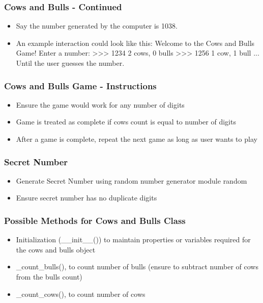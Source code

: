 \documentclass[14pt]{beamer}
\begin{document}
    \begin{frame}[containsverbatim]
        \frametitle{Cows and Bulls - Continued}
        \begin{itemize}
		\item Say the number generated by the computer is 1038. 
		\item An example interaction could look like this:
  Welcome to the Cows and Bulls Game! 
  Enter a number: 
  >>> 1234
  2 cows, 0 bulls
  >>> 1256
  1 cow, 1 bull
  ...
Until the user guesses the number.
        \end{itemize}
    \end{frame}

    \begin{frame}[containsverbatim]
        \frametitle{Cows and Bulls Game -  Instructions}
        \begin{itemize}
		\item Ensure the game would work for any number of digits
		\item Game is treated as complete if cows count is equal to number of digits
		\item After a game is complete, repeat the next game as long as user wants to play
        \end{itemize}
    \end{frame}

    \begin{frame}[containsverbatim]
        \frametitle{Secret Number}
        \begin{itemize}
		\item Generate Secret Number using random number generator module random
		\item Ensure secret number has no duplicate digits
        \end{itemize}
    \end{frame}

    \begin{frame}[containsverbatim]
        \frametitle{Possible Methods for Cows and Bulls Class}
        \begin{itemize}
        \item Initialization (\_\_init\_\_()) to maintain properties or variables required for the cows and bulls object
        \item \_count\_bulls(), to count number of bulls (ensure to subtract number of cows from the bulls count)
        \item \_count\_cows(), to count number of cows
        \end{itemize}
    \end{frame}
\end{document}
